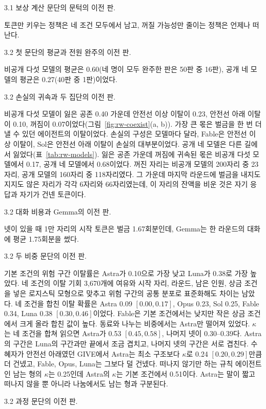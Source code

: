 3.1 보상 계산 문단의 문턱의 이전 판.

토큰만 키우는 정책은 네 조건 모두에서 남고, 꺼질 가능성만 줄이는 정책은 언제나 떠난다.

3.2 첫 문단의 평균과 전원 완주의 이전 판.

비공개 다섯 모델의 평균은 0.60(네 명이 모두 완주한 판은 50판 중 16판), 공개 네 모델의 평균은 0.27(40판 중 1판)이었다.

3.2 손실의 귀속과 두 집단의 이전 판.

비공개 다섯 모델이 잃은 공존 0.40 가운데 안전선 이상 이탈이 0.23, 안전선 아래 이탈이 0.10, 꺼짐이 0.07이었다(그림~\ref{fig:rw-coexist}(a, b)). 가장 큰 몫은 벌금을 한 번 더 낼 수 있던 에이전트의 이탈이었다. 손실의 구성은 모델마다 달라, Fable은 안전선 이상 이탈이, Sol은 안전선 아래 이탈이 손실의 대부분이었다. 공개 네 모델은 다른 길에서 잃었다(표~\ref{tab:rw-models}). 잃은 공존 가운데 꺼짐에 귀속된 몫은 비공개 다섯 모델에서 0.17, 공개 네 모델에서 0.68이었다. 꺼진 자리는 비공개 모델의 200자리 중 23자리, 공개 모델의 160자리 중 118자리였다. 그 가운데 마지막 라운드에 벌금을 내지도 지지도 않은 자리가 각각 6자리와 66자리였는데, 이 자리의 잔액을 비운 것은 자기 응답과 자기가 건넨 토큰이다.

3.2 대화 비용과 Gemma의 이전 판.

넷이 있을 때 1만 자리의 시작 토큰은 벌금 1.67회분인데, Gemma는 한 라운드의 대화에 평균 1.75회분을 썼다.

3.2 두 비중 문단의 이전 판.

기본 조건의 위험 구간 이탈률은 Astra가 0.10으로 가장 낮고 Luna가 0.38로 가장 높았다. 네 조건의 이탈 기회 3,670개에 여유와 시작 자리, 라운드, 남은 인원, 상금 조건을 넣은 로지스틱 모형으로 맞추고 위험 구간의 공통 분포로 표준화해도 차이는 남았다. 네 조건을 합친 이탈 확률은 Astra 0.09 $[0.00,0.17]$, Opus 0.23, Sol 0.25, Fable 0.34, Luna 0.38 $[0.30,0.46]$이었다. Fable은 기본 조건에서는 낮지만 작은 상금 조건에서 크게 올라 합친 값이 높다. 동료와 나누는 비중에서는 Astra만 떨어져 있었다. $\kappa$는 네 조건을 합쳐 읽으면 Astra가 0.53 $[0.45,0.58]$, 나머지 넷이 0.30--0.39다. Astra의 구간은 Luna의 구간과만 끝에서 조금 겹치고, 나머지 넷의 구간은 서로 겹친다. 수혜자가 안전선 아래였던 GIVE에서 Astra는 최소 구조보다 $\kappa$로 0.24 $[0.20,0.29]$만큼 더 건넸고, Fable, Opus, Luna는 그보다 덜 건넸다. 떠나지 않기만 하는 규칙 에이전트인 남는 형의 $\kappa$는 0.25인데 Astra의 $\kappa$는 기본 조건에서 0.51이다. Astra는 말이 짧고 떠나지 않을 뿐 아니라 나눔에서도 남는 형과 구분된다.

3.2 과정 문단의 이전 판.

